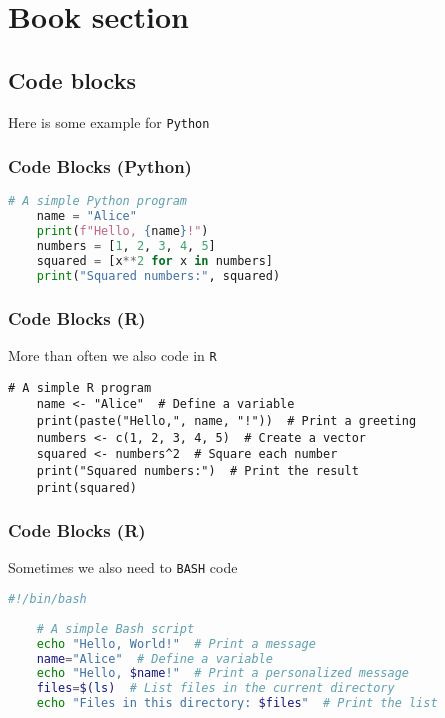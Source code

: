 
\section{Book section}

\subsection{Code blocks}

\begin{frame}[fragile] %

  Here is some example for \verb|Python|

  \frametitle{Code Blocks (Python)}
  \begin{lstlisting}[language=python]
    # A simple Python program
    name = "Alice"
    print(f"Hello, {name}!")
    numbers = [1, 2, 3, 4, 5]
    squared = [x**2 for x in numbers]
    print("Squared numbers:", squared)
  \end{lstlisting}

\end{frame}

\begin{frame}[fragile] %
  \frametitle{Code Blocks (R)}

  More than often we also code in \verb|R|

  \begin{lstlisting}[language=rlang]
    # A simple R program
    name <- "Alice"  # Define a variable
    print(paste("Hello,", name, "!"))  # Print a greeting
    numbers <- c(1, 2, 3, 4, 5)  # Create a vector
    squared <- numbers^2  # Square each number
    print("Squared numbers:")  # Print the result
    print(squared)
  \end{lstlisting}

\end{frame}

\begin{frame}[fragile] %
  \frametitle{Code Blocks (R)}

  Sometimes we also need to \verb|BASH| code

  \begin{lstlisting}[language=bash]
    #!/bin/bash
    
    # A simple Bash script
    echo "Hello, World!"  # Print a message
    name="Alice"  # Define a variable
    echo "Hello, $name!"  # Print a personalized message
    files=$(ls)  # List files in the current directory
    echo "Files in this directory: $files"  # Print the list
  \end{lstlisting}

\end{frame}


